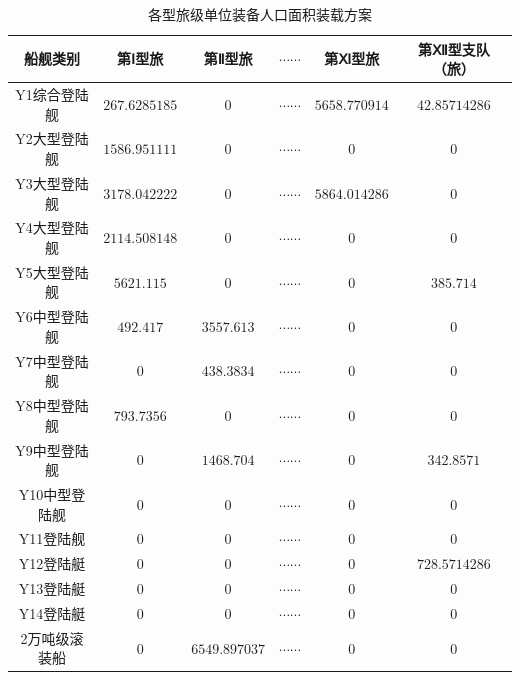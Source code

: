 \documentclass{whutmod}
\begin{document}
\begin{table}[H]
\centering		\caption{各型旅级单位装备人口面积装载方案}\label{zhuangzai}
\begin{tabular}{cccccc}
	\toprule[2pt]
	\multicolumn{1}{m{2cm}}{\centering 船舰类别}
	& \multicolumn{1}{m{2cm}}{\centering 第Ⅰ型旅}
	&\multicolumn{1}{m{2cm}}{\centering 第Ⅱ型旅}
	& \multicolumn{1}{m{3cm}}{\centering $ \cdots \cdots  $}
	& \multicolumn{1}{m{2cm}}{\centering 第Ⅺ型旅}
	& \multicolumn{1}{m{2cm}}{\centering 第Ⅻ型支队（旅）}
	\\
	\midrule[1pt]
	Y1综合登陆舰 &  $267.6285185$  &$0$ & $\cdots \cdots$&$5658.770914
	$ &$42.85714286$ \\ 
	Y2大型登陆舰	 &  $1586.951111$&$0$& $\cdots \cdots$ &$0$ &$0$\\ 
	Y3大型登陆舰	 &  $3178.042222 $ &$0$& $\cdots \cdots$ &$5864.014286
	$ &$0$\\ 
	Y4大型登陆舰	 &  $2114.508148 $ &$0$& $\cdots \cdots$ &$0
	$ &$0$\\ 
	Y5大型登陆舰	 &$5621.115$ &$0$& $\cdots \cdots$ &$0
	$ &$385.714$\\
	Y6中型登陆舰	 &$492.417$ &$3557.613$& $\cdots \cdots$ &$0
	$ &$0$\\
	Y7中型登陆舰	 &$0$ &$438.3834$& $\cdots \cdots$ &$0
	$ &$0$\\
	Y8中型登陆舰	 &$793.7356$ &$0$& $\cdots \cdots$ &$0
	$ &$0$\\
	Y9中型登陆舰	 &$0$ &$1468.704$& $\cdots \cdots$ &$0
	$ &$342.8571$\\
	Y10中型登陆舰	 &$0$ &$0$ & $\cdots \cdots$ &$0
	$ &$0$ \\
	Y11登陆舰	 &$0$ &$0$& $\cdots \cdots$ &$0$ &$0$ \\
	Y12登陆艇	 &  $0$ &$0$ & $\cdots \cdots$ &$0$ &$728.5714286$\\ 
	Y13登陆艇	 &  $0$ &$0$ & $\cdots \cdots$ &$0$ &$0$\\ 
	Y14登陆艇		 &  $0$ &$0$ & $\cdots \cdots$ &$0$ &$0$\\ 
	2万吨级滚装船  &  $0 $ &$6549.897037$& $\cdots \cdots$ &$0$ &$0$ \\ 
	\bottomrule[2pt]	
\end{tabular}
\end{table}
\end{document}
